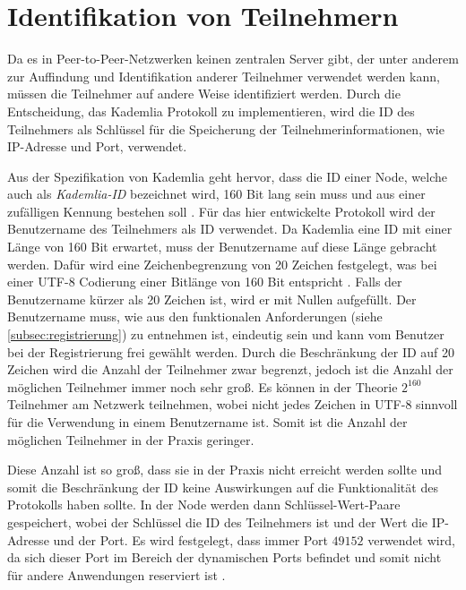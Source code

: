 \section{Identifikation von Teilnehmern}
\label{subsec:identifikation_von_teilnehmern}

Da es in Peer-to-Peer-Netzwerken keinen zentralen Server gibt, der unter anderem zur Auffindung und Identifikation anderer Teilnehmer verwendet werden kann, müssen die Teilnehmer auf andere Weise identifiziert werden. Durch die Entscheidung, das Kademlia Protokoll zu implementieren, wird die ID des Teilnehmers als Schlüssel für die Speicherung der Teilnehmerinformationen, wie IP-Adresse und Port, verwendet.

Aus der Spezifikation von Kademlia geht hervor, dass die ID einer Node, welche auch als \textit{Kademlia-ID} bezeichnet wird, 160 Bit lang sein muss und aus einer zufälligen Kennung bestehen soll \parencite[S. 2]{Maymounkov_Kademlia}. Für das hier entwickelte Protokoll wird der Benutzername des Teilnehmers als ID verwendet. Da Kademlia eine ID mit einer Länge von 160 Bit erwartet, muss der Benutzername auf diese Länge gebracht werden. Dafür wird eine Zeichenbegrenzung von 20 Zeichen festgelegt, was bei einer UTF-8 Codierung einer Bitlänge von 160 Bit entspricht \parencite{rfc3629_utf-8}. Falls der Benutzername kürzer als 20 Zeichen ist, wird er mit Nullen aufgefüllt.
Der Benutzername muss, wie aus den funktionalen Anforderungen (siehe \ref{subsec:registrierung}) zu entnehmen ist, eindeutig sein und kann vom Benutzer bei der Registrierung frei gewählt werden. 
Durch die Beschränkung der ID auf 20 Zeichen wird die Anzahl der Teilnehmer zwar begrenzt, jedoch ist die Anzahl der möglichen Teilnehmer immer noch sehr groß. Es können in der Theorie $2^{160}$ Teilnehmer am Netzwerk teilnehmen, wobei nicht jedes Zeichen in UTF-8 sinnvoll für die Verwendung in einem Benutzername ist. Somit ist die Anzahl der möglichen Teilnehmer in der Praxis geringer.

Diese Anzahl ist so groß, dass sie in der Praxis nicht erreicht werden sollte und somit die Beschränkung der ID keine Auswirkungen auf die Funktionalität des Protokolls haben sollte.
In der Node werden dann Schlüssel-Wert-Paare gespeichert, wobei der Schlüssel die ID des Teilnehmers ist und der Wert die IP-Adresse und der Port. Es wird festgelegt, dass immer Port $49152$ verwendet wird, da sich dieser Port im Bereich der dynamischen Ports befindet und somit nicht für andere Anwendungen reserviert ist \parencite[S. 20]{rfc6335_IANA_Ports}. 

